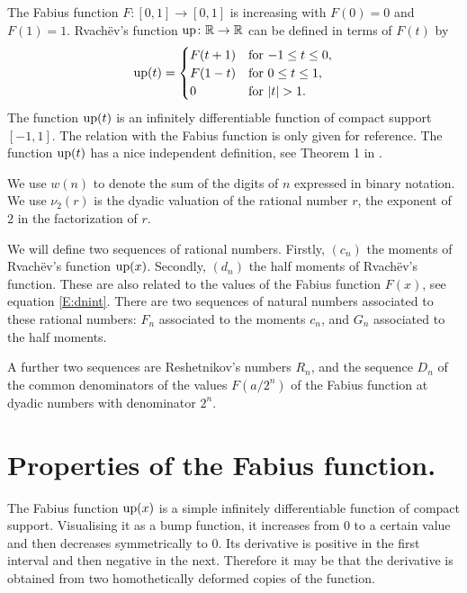 \documentclass[10pt]{amsart}
\theoremstyle{definition}
\theoremstyle{remark}
\begin{document}
The Fabius function $F\colon[0,1]\to[0,1]$ is increasing with $F(0)=0$ and $F(1)=1$.
Rvach{\"e}v's function $\operatorname{up}\colon\mathbb{R}\to\mathbb{R}$ can be defined in terms of $F(t)$ by
\[\RvachevUp(t)=\begin{cases} F(t+1) & \text{for $-1\le t\le0$},\\
F(1-t) & \text{for $0\le t\le 1$},\\
0 & \text{for $|t|>1$}.
\end{cases}
\]
The function $\operatorname{up}(t)$ is an infinitely differentiable function of compact
support $[-1,1]$.
The relation with the Fabius function is only given for reference.
The function $\operatorname{up}(t)$ has a nice independent
definition, see Theorem 1 in \cite{MR666839}.

We use $w(n)$ to denote the sum of the digits of $n$ expressed in binary notation.
We use $\nu_2(r)$ is the dyadic  valuation of the rational number $r$, the exponent of $2$ in the
factorization of $r$.

We will define two sequences of rational numbers. Firstly,  $(c_n)$ the moments of Rvach{\"e}v's function $\operatorname{up}(x)$. Secondly,
$(d_n)$ the half moments of Rvach{\"e}v's function. These are also related to the values
of the Fabius
function $F(x)$, see equation \eqref{E:dnint}.  There are two sequences of natural numbers associated to these rational
numbers: $F_n$ associated to the moments $c_n$,  and $G_n$ associated to the half moments.

A further  two sequences are Reshetnikov's numbers $R_n$, and the sequence $D_n$ of
the  common denominators of
the values  $F(a/2^n)$ of the Fabius function at dyadic numbers with denominator $2^n$.










\section{Properties of the Fabius function.}

The Fabius function $\operatorname{up}(x)$ is a simple
infinitely differentiable function of compact support. Visualising it as a bump function,
it   increases from $0$ to a certain value and then decreases symmetrically
to $0$. Its derivative is positive in the first interval and then negative in the next.
Therefore it may be  that the derivative is obtained from two
homothetically deformed copies of the function.
\end{document}
